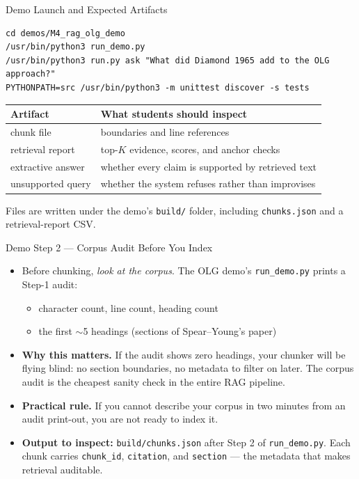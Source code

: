 \begin{frame}[fragile]{Demo Launch and Expected Artifacts}
\begin{lstlisting}[basicstyle=\ttfamily\scriptsize, numbers=none]
cd demos/M4_rag_olg_demo
/usr/bin/python3 run_demo.py
/usr/bin/python3 run.py ask "What did Diamond 1965 add to the OLG approach?"
PYTHONPATH=src /usr/bin/python3 -m unittest discover -s tests
\end{lstlisting}

\vspace{0.2cm}
\begin{tabular}{p{3.0cm}p{8.5cm}}
\toprule
\textbf{Artifact} & \textbf{What students should inspect} \\
\midrule
chunk file & boundaries and line references \\
retrieval report & top-$K$ evidence, scores, and anchor checks \\
extractive answer & whether every claim is supported by retrieved text \\
unsupported query & whether the system refuses rather than improvises \\
\bottomrule
\end{tabular}

\vspace{0.12cm}
{\scriptsize Files are written under the demo's \texttt{build/} folder, including \texttt{chunks.json} and a retrieval-report CSV.}
\end{frame}

\begin{frame}{Demo Step 2 --- Corpus Audit Before You Index}
\begin{itemize}
\item Before chunking, \emph{look at the corpus}. The OLG demo's \texttt{run\_demo.py} prints a Step-1 audit:
\begin{itemize}\small
    \item character count, line count, heading count
    \item the first $\sim$5 headings (sections of Spear--Young's paper)
\end{itemize}

\medskip
\item \textbf{Why this matters.} If the audit shows zero headings, your chunker will be flying blind: no section boundaries, no metadata to filter on later. The corpus audit is the cheapest sanity check in the entire RAG pipeline.

\medskip
\item \textbf{Practical rule.} If you cannot describe your corpus in two minutes from an audit print-out, you are not ready to index it.

\medskip
\item \textbf{Output to inspect:} \texttt{build/chunks.json} after Step 2 of \texttt{run\_demo.py}. Each chunk carries \texttt{chunk\_id}, \texttt{citation}, and \texttt{section} --- the metadata that makes retrieval auditable.
\end{itemize}
\end{frame}

